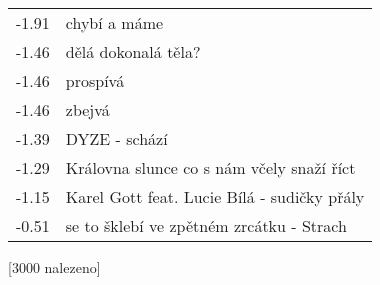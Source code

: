 \begin{table}[H]
\begin{tt}
\begin{minipage}[t]{.5\textwidth}
\begin{tabulary}{1.1\textwidth}{LL}
-1.91 &   chybí a  máme \\
-1.46 &   dělá dokonalá těla? \\
-1.46 &   prospívá \\
-1.46 &   zbejvá \\
-1.39 & DYZE -   schází \\
-1.29 & Královna slunce  co s nám včely snaží říct \\
-1.15 & Karel Gott feat. Lucie Bílá -  sudičky přály  \\
-0.51 &  se to   šklebí ve zpětném zrcátku - Strach \\
\end{tabulary}
\end{minipage}

\horizlina

\noindent
\begin{minipage}[t]{.5\textwidth}\vspace{0pt}
 [3000 nalezeno]\vspace{5pt}


\end{minipage}
\end{tt}
\end{table}
